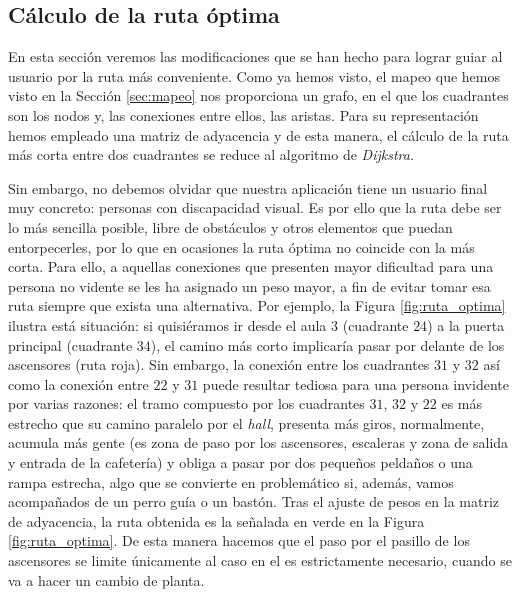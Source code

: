 \subsection{Cálculo de la ruta óptima}
\label{sub:rutaOptima}

En esta sección veremos las modificaciones que se han hecho para lograr guiar al usuario por la ruta más conveniente. Como ya hemos visto, el mapeo que hemos visto en la Sección \ref{sec:mapeo} nos proporciona un grafo, en el que los cuadrantes son los nodos y, las conexiones entre ellos, las aristas. Para su representación hemos empleado una matriz de adyacencia y de esta manera, el cálculo de la ruta más corta entre dos cuadrantes se reduce al algoritmo de \textit{Dijkstra}.

Sin embargo, no debemos olvidar que nuestra aplicación tiene un usuario final muy concreto: personas con discapacidad visual. Es por ello que la ruta debe ser lo más sencilla posible, libre de obstáculos y otros elementos que puedan entorpecerles, por lo que en ocasiones la ruta óptima no coincide con la más corta. Para ello, a aquellas conexiones que presenten mayor dificultad para una persona no vidente se les ha asignado un peso mayor, a fin de evitar tomar esa ruta siempre que exista una alternativa. Por ejemplo, la Figura \ref{fig:ruta_optima} ilustra está situación: si quisiéramos ir desde el aula 3 (cuadrante $24$) a la puerta principal (cuadrante $34$), el camino más corto implicaría pasar por delante de los ascensores (ruta roja). Sin embargo, la conexión entre los cuadrantes $31$ y $32$ así como la conexión entre $22$ y $31$ puede resultar tediosa para una persona invidente por varias razones: el tramo compuesto por los cuadrantes $31$, $32$ y $22$ es más estrecho que su camino paralelo por el \textit{hall}, presenta más giros, normalmente, acumula más gente (es zona de paso por los ascensores, escaleras y zona de salida y entrada de la cafetería) y obliga a pasar por dos pequeños peldaños o una rampa estrecha, algo que se convierte en problemático si, además, vamos acompañados de un perro guía o un bastón. Tras el ajuste de pesos en la matriz de adyacencia, la ruta obtenida es la señalada en verde en la Figura \ref{fig:ruta_optima}. De esta manera hacemos que el paso por el pasillo de los ascensores se limite únicamente al caso en el es estrictamente necesario, cuando se va a hacer un cambio de planta.


